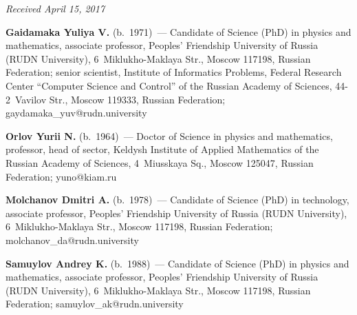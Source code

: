 \begin{multicols}{2}
{{\begin{thebibliography}{99}
\end{thebibliography}

 }
 }

\end{multicols}

\vspace*{-3pt}

\hfill{\small\textit{Received April 15, 2017}}

\Contr

\noindent
\textbf{Gaidamaka Yuliya V.} (b.\ 1971)~--- Candidate of Science (PhD) in physics 
and mathematics, associate professor, Peoples' Friendship University of Russia 
(RUDN University), 6~Miklukho-Maklaya Str., Moscow 117198, Russian 
Federation; senior scientist, Institute of Informatics Problems, Federal Research 
Center ``Computer Science and Control'' of the Russian Academy of Sciences,  
44-2~Vavilov Str., Moscow 119333, Russian Federation; 
\mbox{gaydamaka\_yuv@rudn.university}

\vspace*{3pt}

\noindent
\textbf{Orlov Yurii N.} (b.\ 1964)~--- Doctor of Science in physics and 
mathematics, professor, head of sector, Keldysh Institute of Applied Mathematics of 
the Russian Academy of Sciences, 4~Miusskaya Sq., Moscow 125047, Russian 
Federation; \mbox{yuno@kiam.ru}

\vspace*{3pt}

\noindent
\textbf{Molchanov Dmitri A.} (b.\ 1978)~---  Candidate of Science (PhD) in 
technology, associate professor, Peoples' Friendship University of Russia (RUDN 
University), 6~Miklukho-Maklaya Str., Moscow 117198, Russian Federation; 
\mbox{molchanov\_da@rudn.university}

\vspace*{3pt}

\noindent
\textbf{Samuylov Andrey K.} (b.\ 1988)~--- Candidate of Science (PhD) in 
physics and mathematics, associate professor, Peoples' Friendship University of 
Russia (RUDN University), 6~Miklukho-Maklaya Str., Moscow 117198, Russian 
Federation; \mbox{samuylov\_ak@rudn.university}
\label{end\stat}


\renewcommand{\bibname}{\protect\rm Литература} 
